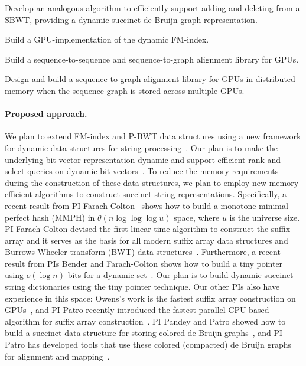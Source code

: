 \begin{rproblem}
Develop an analogous algorithm to efficiently support adding and deleting \kmers from a SBWT, providing a dynamic succinct de Bruijn graph representation.
\label{rpob:dynamic-sbwt}
\end{rproblem}

\begin{rproblem}
Build a GPU-implementation of the dynamic FM-index.
\label{rpob:gpu-fmindex}
\end{rproblem}


\begin{rproblem}
Build a sequence-to-sequence and sequence-to-graph alignment library for GPUs.
\end{rproblem}

\begin{rproblem}
Design and build a sequence to graph alignment library for GPUs in distributed-memory when the sequence graph is stored across multiple GPUs.
\end{rproblem}

\paragraph{Proposed approach.}

We plan to extend FM-index and P-BWT data structures using a new framework for dynamic data structures for string processing~\cite{Nicola17,Farzan2011}. Our plan is to make the underlying bit vector representation dynamic and support efficient rank and select queries on dynamic bit vectors~\cite{Raman2001}.
To reduce the memory requirements during the construction of these data structures, we plan to employ new memory-efficient algorithms to construct succinct string representations. Specifically, a recent result from PI Farach-Colton~\cite{Assadi2023} shows how to build a monotone minimal perfect hash (MMPH) in $\theta(n \log{\log{\log u}})$ space, where $u$ is the universe size.
%
PI Farach-Colton devised the first linear-time algorithm to construct the suffix array and it serves as the basis for all modern suffix array data structures and Burrows-Wheeler transform (BWT) data structures~\cite{Farach97,Ambainis97}. Furthermore, a recent result from PIs Bender and Farach-Colton shows how to build a tiny pointer using $o(\log{n})$-bits for a dynamic set~\cite{Bender2023}. Our plan is to build dynamic succinct string dictionaries using the tiny pointer technique. Our other PIs also have experience in this space:
Owens's work is the fastest suffix array construction on GPUs~\cite{Wang:2016:FPS}, and PI Patro recently introduced the fastest parallel CPU-based algorithm for suffix array construction~\cite{Khan2023CapsSA}. PI Pandey and Patro showed how to build a succinct data structure for storing colored de Bruijn graphs~\cite{almodaresi2017rainbowfish}, and PI Patro has developed tools that use these colored (compacted) de Bruijn graphs for alignment and mapping~\cite{Almodaresi2018Pufferfish,Almodaresi2021,fan2023fulgor,Pibiri2023MacDBG,he2022alevin}.
